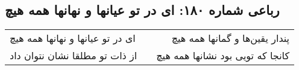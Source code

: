 \begin{center}
\section*{رباعی شماره ۱۸۰: ای در تو عیانها و نهانها همه هیچ}
\label{sec:sh180}
\begin{longtable}{l p{0.5cm} r}
ای در تو عیانها و نهانها همه هیچ
&&
پندار یقین‌ها و گمانها همه هیچ
\\
از ذات تو مطلقا نشان نتوان داد
&&
کانجا که تویی بود نشانها همه هیچ
\\
\end{longtable}
\end{center}
